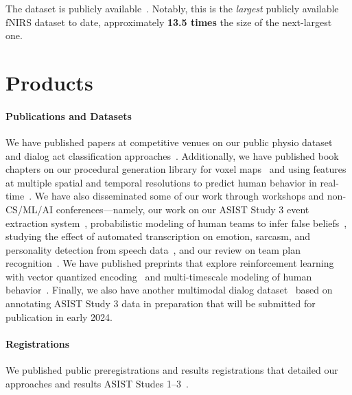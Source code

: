 \documentclass[11pt,article,oneside]{memoir}
\begin{document}
The dataset is publicly available~\citep{pyarelal2023the}. Notably, this is
the \emph{largest} publicly available fNIRS dataset to date, approximately
\textbf{13.5 times} the size of the next-largest one.



\section{Products}

\paragraph{Publications and Datasets} We have published papers at competitive
venues on our public physio dataset~\citep{pyarelal2023the} and dialog act
classification approaches~\citep{qamar-etal-2023-speaking,
miah-etal-2023-hierarchical}.  Additionally, we have published book chapters on
our procedural generation library for voxel maps~\citep{Pyarelal.ea:2022} and
using features at multiple spatial and temporal resolutions to predict human
behavior in real-time~\citep{Zhang.ea:2022c}. We have also disseminated some of
our work through workshops and non-CS/ML/AI conferences---namely, our work on
our ASIST Study 3 event extraction system~\citep{nitschke-etal-2022-rule},
probabilistic modeling of human teams to infer false
beliefs~\citep{Soares.ea:2021}, studying the effect of automated transcription
on emotion, sarcasm, and personality detection from speech
data~\citep{culnan-etal-2021-ire}, and our review on team plan
recognition~\citep{Rieffer_Champlin_2023}.  We have published preprints that
explore reinforcement learning with vector quantized
encoding~\citep{Zhang.ea:2022a} and multi-timescale modeling of human
behavior~\citep{Basavaraj.ea:2022}. Finally, we also have another multimodal
dialog dataset~\citep{multicat} based on annotating ASIST Study 3 data in
preparation that will be submitted for publication in early 2024.

\paragraph{Registrations} We published public preregistrations and results
registrations that detailed our approaches and results ASIST Studes
1--3~\citep{study_1_preregistration_and_results, study_2_preregistration,
    study_2_results, study_3_preregistration, study_3_results}.
\end{document}
